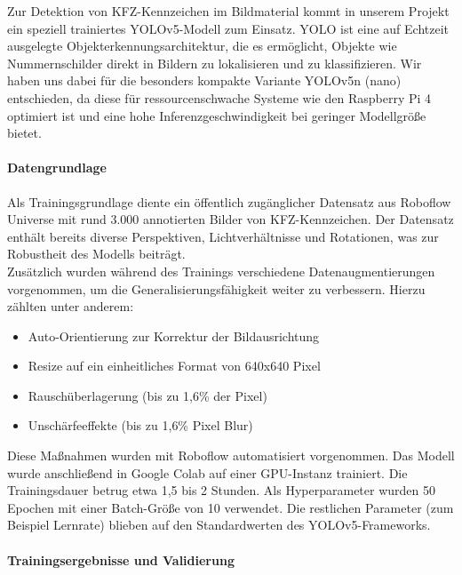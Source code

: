 Zur Detektion von KFZ-Kennzeichen im Bildmaterial kommt in unserem Projekt ein speziell trainiertes YOLOv5-Modell zum Einsatz. YOLO  ist eine auf Echtzeit ausgelegte Objekterkennungsarchitektur, die es ermöglicht, Objekte wie Nummernschilder direkt in Bildern zu lokalisieren und zu klassifizieren. Wir haben uns dabei für die besonders kompakte Variante YOLOv5n (nano) entschieden, da diese für ressourcenschwache Systeme wie den Raspberry Pi 4 optimiert ist und eine hohe Inferenzgeschwindigkeit bei geringer Modellgröße bietet.

\paragraph{Datengrundlage}

Als Trainingsgrundlage diente ein öffentlich zugänglicher Datensatz aus Roboflow Universe mit rund 3.000 annotierten Bilder von KFZ-Kennzeichen. Der Datensatz enthält bereits diverse Perspektiven, Lichtverhältnisse und Rotationen, was zur Robustheit des Modells beiträgt.\\

Zusätzlich wurden während des Trainings verschiedene Datenaugmentierungen vorgenommen, um die Generalisierungsfähigkeit weiter zu verbessern. \cite{roboflowdataset} Hierzu zählten unter anderem:

\begin{itemize}
    \item Auto-Orientierung zur Korrektur der Bildausrichtung
    \item Resize auf ein einheitliches Format von 640x640 Pixel
    \item Rauschüberlagerung (bis zu 1{,}6\% der Pixel)
    \item Unschärfeeffekte (bis zu 1{,}6\% Pixel Blur)
  \end{itemize}

Diese Maßnahmen wurden mit Roboflow automatisiert vorgenommen. Das Modell wurde anschließend in Google Colab auf einer GPU-Instanz trainiert. Die Trainingsdauer betrug etwa 1,5 bis 2 Stunden. Als Hyperparameter wurden 50 Epochen mit einer Batch-Größe von 10 verwendet. Die restlichen Parameter (zum Beispiel Lernrate) blieben auf den Standardwerten des YOLOv5-Frameworks.

\paragraph{Trainingsergebnisse und Validierung}{}

